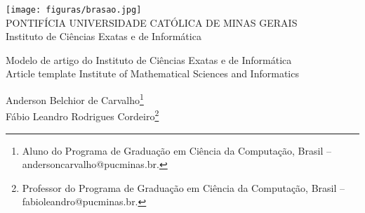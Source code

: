 \documentclass[a4paper,12pt,Times]{article}
\makeatletter
\newcommand{\monog}{Modelo de artigo do Instituto de Ciências Exatas e de Informática}
\newcommand{\monogES}{Article template Institute of Mathematical Sciences and Informatics}
\newcommand{\origem}{Brasil }
\newcommand{\AutorA}{Anderson Belchior de Carvalho}
\newcommand{\funcaoA}{}
\newcommand{\emailA}{andersoncarvalho@pucminas.br}
\newcommand{\cursA}{Aluno do Programa de Graduação em Ciência da Computação}
\newcommand{\AutorB}{Fábio Leandro Rodrigues Cordeiro}
\newcommand{\funcaoB}{}
\newcommand{\emailB}{fabioleandro@pucminas.br}
\newcommand{\cursB}{Professor do Programa de Graduação em Ciência da Computação}
\newcommand{\keyword}[1]{\textsf{#1}}
\makeatother
\begin{document}

\begin{center}
\texttt{[image: figuras/brasao.jpg]} \\
PONTIFÍCIA UNIVERSIDADE CATÓLICA DE MINAS GERAIS \\
Instituto de Ciências Exatas e de Informática


\end{center}

 \vspace{0cm} {
 \singlespacing \Large{\monog {} \\ }
  \normalsize{\monogES}
 }

\vspace{1.0cm}

\begin{flushright}
\singlespacing 
\normalsize{\AutorA \footnote{\funcaoA \cursA, \origem -- \emailA . }} \\
\normalsize{\AutorB \footnote{\funcaoB \cursB, \origem -- \emailB . }} \\
\end{flushright}
\thispagestyle{empty}

\vspace{1.0cm}

\begin{abstract}
\noindent
O resumo deverá conter pelo menos cento e cinquenta palavras de acordo com o padrão de normalização da ABNT.
Este artigo irá abordar as principais linguagens de programação voltadas a ambiente WEB usadas atualmente, 
comparando suas características de maneira a indicar o melhor uso para determinada linguagem. 
As linguagens serão divididas de acordo com 4 principais características: Interpretadas, compiladas, server-side e client-side.
O resumo deverá conter pelo menos cento e cinquenta palavras de acordo com o padrão de normalização da ABNT.
as linguagens serão divididas de acordo com 4 principais características: Interpretadas, compiladas, server-side e client-side.
O resumo deverá conter pelo menos cento e cinquenta palavras de acordo com o padrão de normalização da ABNT.
\\\textbf{\keyword{Palavras-chave: }} Template. \LaTeX. Abakos. Periódicos.
\end{abstract}
\end{document}
